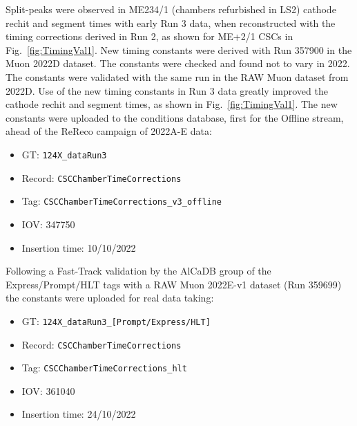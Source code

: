 Split-peaks were observed in ME234/1 (chambers refurbished in LS2) cathode rechit and segment times with early Run 3 data, when reconstructed with the timing corrections derived in Run 2, as shown for ME+2/1 CSCs in Fig.~\ref{fig:TimingVal1}. New timing constants were derived with Run 357900 in the Muon 2022D dataset. The constants were checked and found not to vary in 2022. The constants were validated with the same run in the RAW Muon dataset from 2022D. Use of the new timing constants in Run 3 data greatly improved the cathode rechit and segment times, as shown in Fig.~\ref{fig:TimingVal1}. The new constants were uploaded to the conditions database, first for the Offline stream, ahead of the ReReco campaign of 2022A-E data: 
\begin{itemize}
    \item GT: \texttt{124X\_dataRun3}
    \item Record: \texttt{CSCChamberTimeCorrections}
    \item Tag: \texttt{CSCChamberTimeCorrections\_v3\_offline}
    \item IOV: 347750
    \item Insertion time: 10/10/2022
\end{itemize}

Following a Fast-Track validation by the AlCaDB group of the Express/Prompt/HLT tags with a RAW Muon 2022E-v1 dataset (Run 359699) the constants were uploaded for real data taking:
\begin{itemize}
    \item GT: \texttt{124X\_dataRun3\_[Prompt/Express/HLT]}
    \item Record: \texttt{CSCChamberTimeCorrections}
    \item Tag: \texttt{CSCChamberTimeCorrections\_hlt}
    \item IOV: 361040
    \item Insertion time: 24/10/2022 
\end{itemize}

